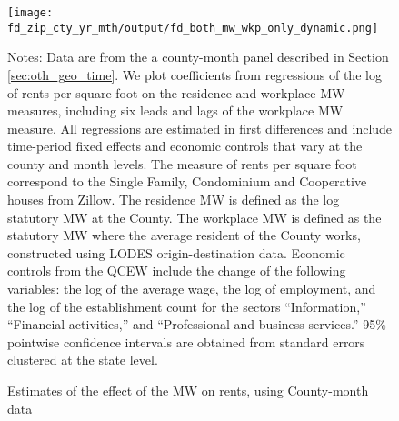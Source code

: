 
\begin{figure}[h!]
    \centering
    \caption{Estimates of the effect of the MW on rents, using County-month data}
    \label{fig:dynamic_county_month}

	\texttt{[image: fd\_zip\_cty\_yr\_mth/output/fd\_both\_mw\_wkp\_only\_dynamic.png]}

    \begin{minipage}{.95\textwidth} \footnotesize
        \vspace{3mm}
        Notes:
        Data are from the a county-month panel described in Section 
        \ref{sec:oth_geo_time}.
        We plot coefficients from regressions of the log of rents per
        square foot on the residence and workplace MW measures, including 
        six leads and lags of the workplace MW measure.
        All regressions are estimated in first differences and include 
        time-period fixed effects and economic controls that vary at the 
        county and month levels.
        The measure of rents per square foot correspond to the Single Family, 
        Condominium and Cooperative houses from Zillow.
        The residence MW is defined as the log statutory MW at the County.
        The workplace MW is defined as the statutory MW where the average 
        resident of the County works, constructed using LODES 
        origin-destination data.
        Economic controls from the QCEW include the change of the following 
        variables: the log of the average wage, the log of employment, and the 
        log of the establishment count for the sectors ``Information,'' 
        ``Financial activities,'' and ``Professional and business services.''
        95\% pointwise confidence intervals are obtained from standard errors 
        clustered at the state level.
    \end{minipage}
\end{figure}

